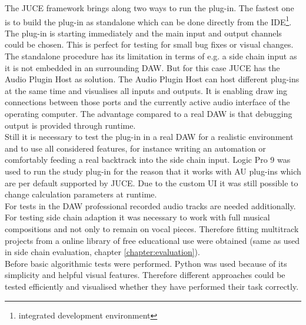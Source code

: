 The JUCE framework brings along two ways to run the plug-in. The fastest one is to build the plug-in as standalone which can be done directly from the IDE\footnote{integrated development environment}. The plug-in is starting immediately and the main input and output channels could be chosen. This is perfect for testing for small bug fixes or visual changes. The standalone procedure has its limitation in terms of e.g. a side chain input as it is not embedded in an surrounding DAW. But for this case JUCE has the Audio Plugin Host as solution. The Audio Plugin Host can host different plug-ins at the same time and visualises all inputs and outputs. It is enabling draw ing connections between those ports and the currently active audio interface of the operating computer. The advantage compared to a real DAW is that debugging output is provided through runtime.\\
Still it is necessary to test the plug-in in a real DAW for a realistic environment and to use all considered features, for instance writing an automation or comfortably feeding a real backtrack into the side chain input. Logic Pro 9 was used to run the study plug-in for the reason that it works with AU plug-ins which are per default supported by JUCE. Due to the custom UI it was still possible to change calculation parameters at runtime.\\
For tests in the DAW professional recorded audio tracks are needed additionally. For testing side chain adaption it was necessary to work with full musical compositions and not only to remain on vocal pieces. Therefore fitting multitrack projects from a online library\cite{MultiT} of free educational use were obtained (same as used in side chain evaluation, chapter \ref{chapter:evaluation}).\\
Before basic algorithmic tests were performed. Python was used because of its simplicity and helpful visual features. Therefore different approaches could be tested efficiently and visualised whether they have performed their task correctly.\\
